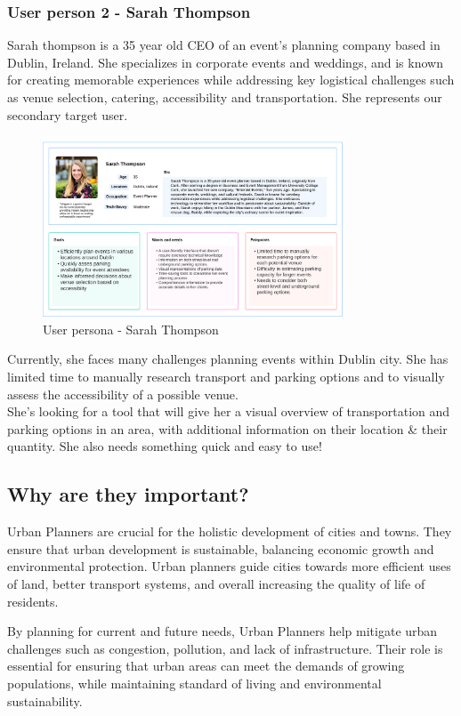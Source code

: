 \subsubsection{User person 2 - Sarah Thompson}
Sarah thompson is a 35 year old CEO of an event's planning company based in Dublin, Ireland. She specializes in corporate events and weddings, and is known for creating memorable experiences while addressing key logistical challenges such as venue selection, catering, accessibility and transportation. She represents our secondary target user.
\begin{figure}[h!]
    \centering
    \includegraphics[width=0.8\textwidth]{images/sarah-thompson-userpersona.png}
    \caption{User persona - Sarah Thompson}
\end{figure}
Currently, she faces many challenges planning events within Dublin city. She has limited time to manually research transport and parking options and to visually assess the accessibility of a possible venue.\\
She's looking for a tool that will give her a visual overview of transportation and parking options in an area, with additional information on their location  \& their quantity. She also needs something quick and easy to use!\\

\newpage
\subsection{Why are they important?}
Urban Planners are crucial for the holistic development of cities and towns.
They ensure that urban development is sustainable, balancing economic growth and
environmental protection. Urban planners guide cities towards more efficient
uses of land, better transport systems, and overall increasing the quality of
life of residents.

By planning for current and future needs, Urban Planners help mitigate urban
challenges such as congestion, pollution, and lack of infrastructure. Their role
is essential for ensuring that urban areas can meet the demands of growing
populations, while maintaining standard of living and environmental
sustainability.

